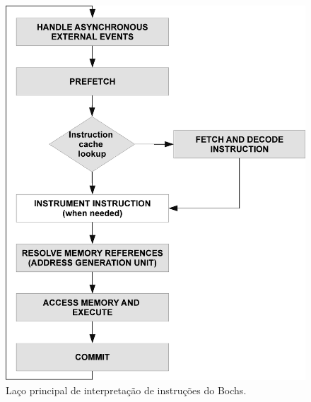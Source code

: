 \documentclass[11pt,twoside]{article}
\begin{document}
\begin{figure}[!h]
  	\begin{center}
    	\includegraphics[scale=0.5]{figures/bochs_loop}
	\end{center}
	\caption{Laço principal de interpretação de instruções do Bochs.}
	\label{fig:bochs_loop}
\end{figure}
\end{document}
